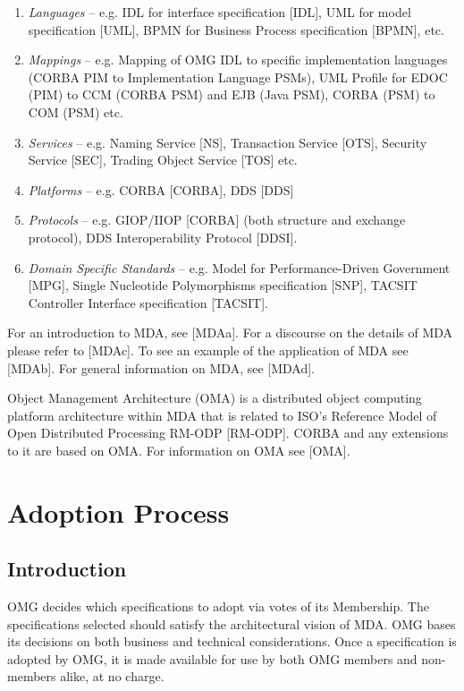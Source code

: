 \begin{enumerate}
\item \textit{Languages} -- e.g. IDL for interface specification [IDL], UML for model specification [UML], BPMN for Business Process specification [BPMN], etc.
\item \textit{Mappings} -- e.g. Mapping of OMG IDL to specific implementation languages (CORBA PIM to Implementation Language PSMs), UML Profile for EDOC (PIM) to CCM (CORBA PSM) and EJB (Java PSM), CORBA (PSM) to COM (PSM) etc.
\item \textit{Services} -- e.g. Naming Service [NS], Transaction Service [OTS], Security Service [SEC], Trading Object Service [TOS] etc.
\item \textit{Platforms} -- e.g. CORBA [CORBA], DDS [DDS]
\item \textit{Protocols} -- e.g. GIOP/IIOP [CORBA] (both structure and exchange protocol), DDS Interoperability Protocol [DDSI].
\item \textit{Domain Specific Standards} -- e.g. Model for Performance-Driven Government [MPG], Single Nucleotide Polymorphisms specification [SNP], TACSIT Controller Interface specification [TACSIT].
\end{enumerate}

For an introduction to MDA, see [MDAa]. For a discourse on the details of MDA please refer to [MDAc]. To see an example of the application of MDA see [MDAb]. For general information on MDA, see [MDAd].

Object Management Architecture (OMA) is a distributed object computing platform architecture within MDA that is related to ISO's Reference Model of Open Distributed Processing RM-ODP [RM-ODP]. CORBA and any extensions to it are based on OMA. For information on OMA see [OMA].


\section{Adoption Process}\label{adoption}
\subsection{Introduction}

OMG decides which specifications to adopt via votes of its Membership. The specifications selected should satisfy the architectural vision of MDA. OMG bases its decisions on both business and technical considerations. Once a specification is adopted by OMG, it is made available for use by both OMG members and non-members alike, at no charge.

